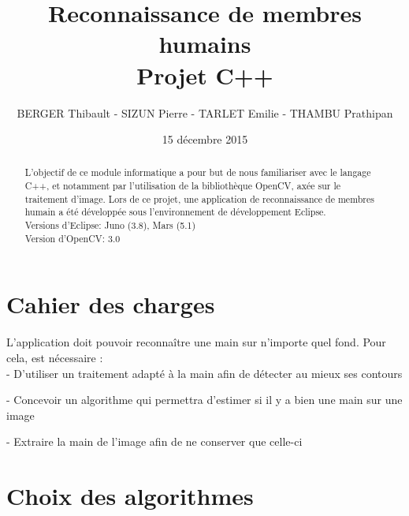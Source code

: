 \documentclass[10pt,a4paper]{report}
\begin{document}
\title{Reconnaissance de membres humains\\
Projet C++}
\author{BERGER Thibault - SIZUN Pierre - TARLET Emilie - THAMBU Prathipan}
\date{15 d\'ecembre 2015}
\maketitle

\begin{abstract}
L'objectif de ce module informatique a pour but de nous familiariser avec le langage C++, et notamment par l'utilisation de la bibliothèque OpenCV, axée sur le traitement d'image.
Lors de ce projet, une application de reconnaissance de membres humain a été développée sous l'environnement de développement Eclipse.\\
\newline
Versions d'Eclipse: Juno (3.8), Mars (5.1)\\
Version d'OpenCV: 3.0
\end{abstract}

\tableofcontents
\newpage


\section{Cahier des charges}

L'application doit pouvoir reconnaître une main sur n’importe quel fond.  Pour cela, est nécessaire :\\

	- D'utiliser un traitement adapté à la main afin de détecter au mieux ses contours
	
	- Concevoir un algorithme qui permettra d’estimer si il y a bien une main sur une image 
	
	- Extraire la main de l’image afin de ne conserver que celle-ci


\section{Choix des algorithmes}
\end{document}
